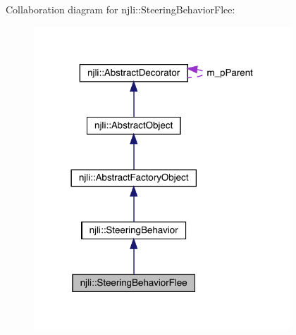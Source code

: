 Collaboration diagram for njli\+:\+:Steering\+Behavior\+Flee\+:\nopagebreak
\begin{figure}[H]
\begin{center}
\leavevmode
\includegraphics[width=273pt]{classnjli_1_1_steering_behavior_flee__coll__graph}
\end{center}
\end{figure}

